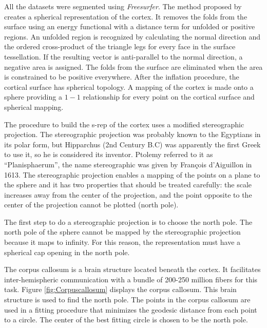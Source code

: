 All the datasets were segmented using \textit{Freesurfer}.
The method proposed by \cite{fischl_cortical_1999} 
creates a spherical representation of the cortex. It removes the folds from the surface using an energy functional 
with a distance term for unfolded or positive regions. 
An unfolded region is recognized by calculating the normal direction and the ordered cross-product
of the triangle legs for every face in the surface tessellation. If the resulting vector 
is anti-parallel to the normal direction, a negative area is assigned. 
The folds from the surface are eliminated when the area is constrained to be
positive everywhere.
After the inflation procedure, the cortical surface has spherical topology. 
A mapping of the cortex is made onto a sphere providing 
a $1-1$ relationship for every point on the cortical surface and spherical mapping.

The procedure to build the s-rep of the cortex uses a modified stereographic projection.
The stereographic projection \cite{snyder_map_1987} was probably known to the Egyptians in its polar form, 
but Hipparchus (2nd Century B.C) was apparently the first Greek to use it, so he is considered its inventor. 
Ptolemy referred to it as ``Planisphaerum'', the name stereographic was given by Fran\c{c}ois d'Aiguillon in 1613.
The stereographic projection enables a mapping of the points on a plane
to the sphere and it has two properties that should be treated carefully:
the scale increases away from the center of the projection,
and the point opposite to the center of the projection cannot be plotted (north pole).

The first step to do a stereographic projection is to choose the north pole. 
The north pole of the sphere cannot be mapped by the stereographic projection because it
maps to infinity. For this reason, the representation must have a spherical cap opening in the north pole.

The corpus callosum is a brain structure located 
beneath the cortex. It facilitates inter-hemispheric communication with a bundle of 200-250 million fibers for this task.
Figure \ref{fig:Corpuscallosum} displays the corpus callosum. 
This brain structure is used to find the north pole.
The points in the corpus callosum are used in a fitting procedure that minimizes the geodesic distance from each point to a circle. 
The center of the best fitting circle is chosen to be the north pole.

